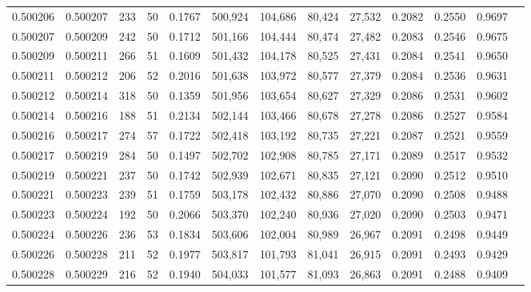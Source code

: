 \begin{tabular}{rrrrrrrrrrrrr}
0.500206 & 0.500207 & 233 &  50 &                                     0.1767 & 500,924 & 104,686 &  80,424 &  27,532 & 0.2082 & 0.2550 & 0.9697 \\
0.500207 & 0.500209 & 242 &  50 &                                     0.1712 & 501,166 & 104,444 &  80,474 &  27,482 & 0.2083 & 0.2546 & 0.9675 \\
0.500209 & 0.500211 & 266 &  51 &                                     0.1609 & 501,432 & 104,178 &  80,525 &  27,431 & 0.2084 & 0.2541 & 0.9650 \\
0.500211 & 0.500212 & 206 &  52 &                                     0.2016 & 501,638 & 103,972 &  80,577 &  27,379 & 0.2084 & 0.2536 & 0.9631 \\
0.500212 & 0.500214 & 318 &  50 &                                     0.1359 & 501,956 & 103,654 &  80,627 &  27,329 & 0.2086 & 0.2531 & 0.9602 \\
0.500214 & 0.500216 & 188 &  51 &                                     0.2134 & 502,144 & 103,466 &  80,678 &  27,278 & 0.2086 & 0.2527 & 0.9584 \\
0.500216 & 0.500217 & 274 &  57 &                                     0.1722 & 502,418 & 103,192 &  80,735 &  27,221 & 0.2087 & 0.2521 & 0.9559 \\
0.500217 & 0.500219 & 284 &  50 &                                     0.1497 & 502,702 & 102,908 &  80,785 &  27,171 & 0.2089 & 0.2517 & 0.9532 \\
0.500219 & 0.500221 & 237 &  50 &                                     0.1742 & 502,939 & 102,671 &  80,835 &  27,121 & 0.2090 & 0.2512 & 0.9510 \\
0.500221 & 0.500223 & 239 &  51 &                                     0.1759 & 503,178 & 102,432 &  80,886 &  27,070 & 0.2090 & 0.2508 & 0.9488 \\
0.500223 & 0.500224 & 192 &  50 &                                     0.2066 & 503,370 & 102,240 &  80,936 &  27,020 & 0.2090 & 0.2503 & 0.9471 \\
0.500224 & 0.500226 & 236 &  53 &                                     0.1834 & 503,606 & 102,004 &  80,989 &  26,967 & 0.2091 & 0.2498 & 0.9449 \\
0.500226 & 0.500228 & 211 &  52 &                                     0.1977 & 503,817 & 101,793 &  81,041 &  26,915 & 0.2091 & 0.2493 & 0.9429 \\
0.500228 & 0.500229 & 216 &  52 &                                     0.1940 & 504,033 & 101,577 &  81,093 &  26,863 & 0.2091 & 0.2488 & 0.9409 \\

\end{tabular}
